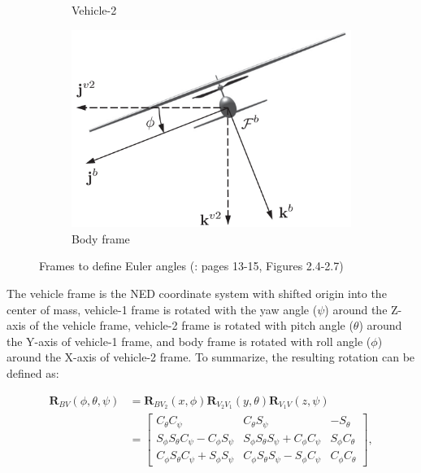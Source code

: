 \begin{figure}[!ht]
\begin{subfigure}{0.38\textwidth}
         \caption{Vehicle-2}
         \label{fig:vehicle-2}
    \end{subfigure}
    \begin{subfigure}{0.38\textwidth}
        \centering
         \includegraphics[width=\textwidth]{figures/body.png}
         \caption{Body frame}
         \label{fig:body}
    \end{subfigure}
    \label{fig:frames}
    \caption{Frames to define Euler angles (\cite{EKF-UAS-2}: pages 13-15, Figures 2.4-2.7)}
\end{figure}

The vehicle frame is the NED coordinate system with shifted origin into the center of mass, vehicle-1 frame is rotated with the yaw angle ($\psi$)  around the Z-axis of the vehicle frame, vehicle-2 frame is rotated with pitch angle ($\theta$) around the Y-axis of vehicle-1 frame, and body frame is rotated with roll angle ($\phi$) around the X-axis of vehicle-2 frame. To summarize, the resulting rotation can be defined as:

\begin{equation}
\begin{aligned}
    \mathbf{R}_{BV}(\phi,\theta,\psi)&=\mathbf{R}_{BV_2}(x,\phi)\mathbf{R}_{V_2V_1}(y,\theta)\mathbf{R}_{V_1V}(z,\psi) \\
    &=
    \begin{bmatrix}
        C_\theta C_\psi & C_\theta S_\psi & -S_\theta \\
        S_\phi S_\theta C_\psi - C_\phi S_\psi & S_\phi S_\theta S_\psi + C_\phi C_\psi & S_\phi C_\theta \\
        C_\phi S_\theta C_\psi + S_\phi S_\psi & C_\phi S_\theta S_\psi - S_\phi C_\psi & C_\phi C_\theta
    \end{bmatrix}, 
\end{aligned}
\label{eq:euler-angles}
\end{equation}

